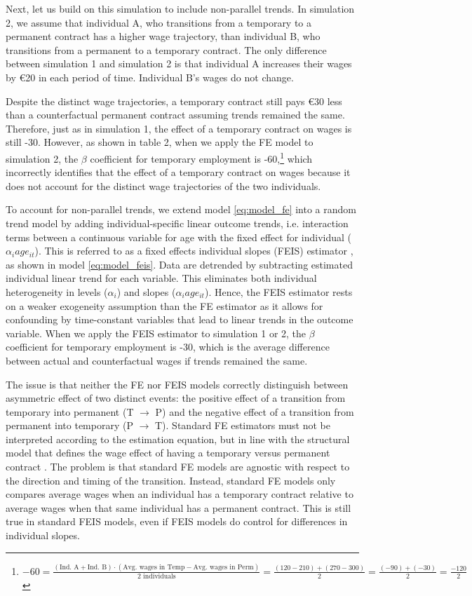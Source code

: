 Next, let us build on this simulation to include non-parallel trends.  In simulation 2, we assume that individual A, who transitions from a temporary to a permanent contract has a higher wage trajectory, than individual B, who transitions from a permanent to a temporary contract.  The only difference between simulation 1 and simulation 2 is that individual A increases their wages by €20 in each period of time.  Individual B's wages do not change.

Despite the distinct wage trajectories, a temporary contract still pays €30 less than a counterfactual permanent contract assuming trends remained the same.  Therefore, just as in simulation 1, the effect of a temporary contract on wages is still -30.  However, as shown in table 2, when we apply the FE model to simulation 2, the $\beta$  coefficient for temporary employment is -60,\footnote{$-60 = \frac{(\text{Ind. A} + \text{Ind. B}) \cdot (\text{Avg. wages in Temp} - \text{Avg. wages in Perm})}{2 \text{ individuals}} = \frac{(120-210) + (270-300)}{2} = \frac{(-90) + (-30)}{2} = \frac{-120}{2}$} which incorrectly identifies that the effect of a temporary contract on wages because it does not account for the distinct wage trajectories of the two individuals.  

To account for non-parallel trends, we extend model \ref{eq:model_fe} into a random trend model by adding individual-specific linear outcome trends, i.e. interaction terms between a continuous variable for age with the fixed effect for individual ($\alpha_i age_{it}$).  This is referred to as a fixed effects individual slopes (FEIS) estimator  \citep{ludwig_is_2018}, as shown in model \ref{eq:model_feis}.  Data are detrended by subtracting estimated individual linear trend for each variable. This eliminates both individual heterogeneity in levels ($\alpha_i$) and slopes ($\alpha_i age_{it}$). Hence, the FEIS estimator rests on a weaker exogeneity assumption than the FE estimator as it allows for confounding by time-constant variables that lead to linear trends in the outcome variable. When we apply the FEIS estimator to simulation 1 or 2, the $\beta$ coefficient for temporary employment is -30, which is the average difference between actual and counterfactual wages if trends remained the same. 

The issue is that neither the FE nor FEIS models correctly distinguish between asymmetric effect of two distinct events: the positive effect of a transition from temporary into permanent (T $\rightarrow$ P) and the negative effect of a transition from permanent into temporary (P $\rightarrow$ T).  Standard FE estimators must not be interpreted according to the estimation equation, but in line with the structural model that defines the wage effect of having a temporary versus permanent contract \citep{an_causal_2017,wooldridge_econometric_2010}.   The problem is that standard FE models are agnostic with respect to the direction and timing of the transition. Instead, standard FE models only compares average wages when an individual has a temporary contract relative to average wages when that same individual has a permanent contract.  This is still true in standard FEIS models, even if FEIS models do control for differences in individual slopes. 

